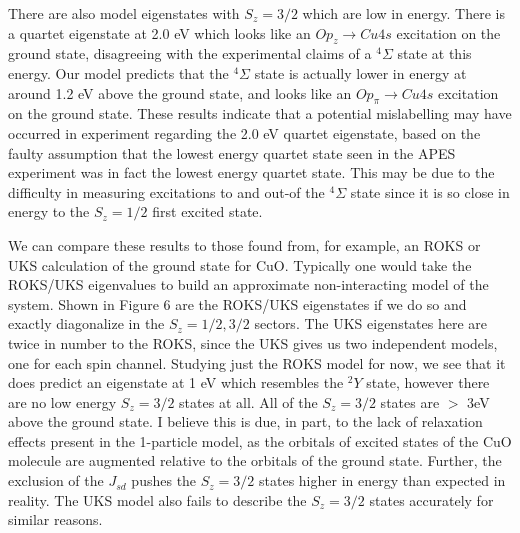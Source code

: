 \documentclass{article}
\begin{document}
There are also model eigenstates with $S_z=3/2$ which are low in energy. There is a quartet eigenstate at 2.0 eV which looks like an $O p_z \rightarrow Cu 4s$ excitation on the ground state, disagreeing with the experimental claims of a $^4\Sigma$ state at this energy. Our model predicts that the $^4\Sigma$ state is actually lower in energy at around 1.2 eV above the ground state, and looks like an $O p_\pi \rightarrow Cu 4s$ excitation on the ground state. These results indicate that a potential mislabelling may have occurred in experiment regarding the 2.0 eV quartet eigenstate, based on the faulty assumption that the lowest energy quartet state seen in the APES experiment was in fact the lowest energy quartet state. This may be due to the difficulty in measuring excitations to and out-of the $^4\Sigma$ state since it is so close in energy to the $S_z=1/2$ first excited state.

We can compare these results to those found from, for example, an ROKS or UKS calculation of the ground state for CuO. Typically one would take the ROKS/UKS eigenvalues to build an approximate non-interacting model of the system. Shown in Figure 6 are the ROKS/UKS eigenstates if we do so and exactly diagonalize in the $S_z=1/2,3/2$ sectors. The UKS eigenstates here are twice in number to the ROKS, since the UKS gives us two independent models, one for each spin channel. Studying just the ROKS model for now, we see that it does predict an eigenstate at 1 eV which resembles the $^2Y$ state, however there are no low energy $S_z=3/2$ states at all. All of the $S_z=3/2$ states are $>$ 3eV above the ground state. I believe this is due, in part, to the lack of relaxation effects present in the 1-particle model, as the orbitals of excited states of the CuO molecule are augmented relative to the orbitals of the ground state. Further, the exclusion of the $J_{sd}$ pushes the $S_z=3/2$ states higher in energy than expected in reality. The UKS model also fails to describe the $S_z=3/2$ states accurately for similar reasons.
\end{document}
